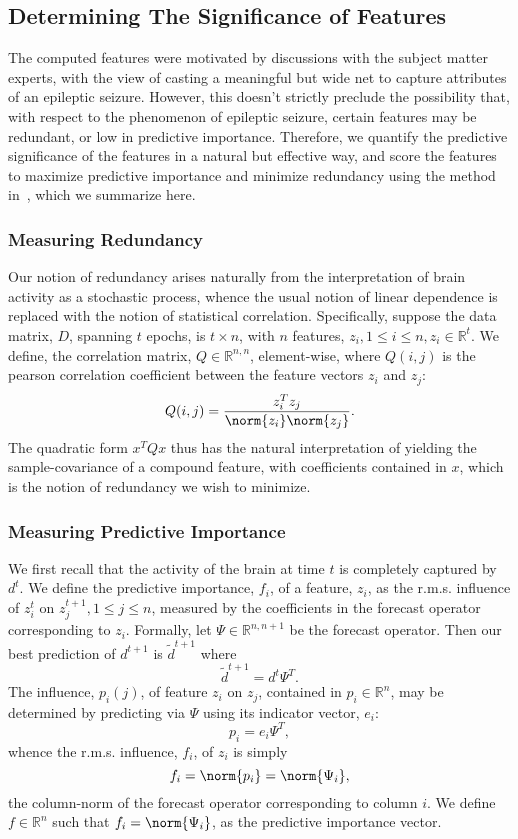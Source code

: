 \documentclass{article} %
\newcommand{\rl}{\mathbb{R}}
\newcommand{\rls}[1]{\mathbb{R}^{#1}}
\begin{document}
\subsection{Determining The Significance of Features}
The computed features were motivated by discussions with the subject matter experts, with the view of casting a meaningful but wide net to capture  attributes of an epileptic seizure. However, this doesn't strictly preclude the possibility that, with respect to the phenomenon of epileptic seizure, certain features may be redundant, or low in predictive importance. Therefore, we quantify the predictive significance of the features in a natural but effective way, and score the features to maximize predictive importance and minimize redundancy using the method in~\cite{quadprog_featsel}, which we summarize here.

\subsubsection{Measuring Redundancy}
Our notion of redundancy arises naturally from the interpretation of brain activity as a stochastic process, whence the usual notion of linear dependence is replaced with the notion of statistical correlation. Specifically, suppose the data matrix, $D$, spanning $t$ epochs, is $t \times n$, with $n$ features, $z_i, 1 \leq i \leq n, z_i \in \rl^t$. We define, the correlation matrix, $Q \in \rls{n, n}$, element-wise, where $Q(i, j)$ is the pearson correlation coefficient between the feature vectors $z_i$ and $z_j$:
\[ Q(i, j) = \frac{z_i ^T z_j}{\norm{z_i}\norm{z_j}}.  \]
The quadratic form $x^T Q x$ thus has the natural interpretation of yielding the sample-covariance of a compound feature, with coefficients contained in $x$, which is the notion of redundancy we wish to minimize.

\subsubsection{Measuring Predictive Importance}
We first recall that the activity of the brain at time $t$ is completely captured by $d^t$. We define the predictive importance, $f_i$, of a feature, $z_i$, as the r.m.s. influence of $z_i ^t$ on $z_j ^{t+1}, 1 \leq j \leq n$, measured by the coefficients in the forecast operator corresponding to $z_i$. Formally, let $\Psi \in \rls{n, n+1}$ be the forecast operator. Then our best prediction of $d^{t+1}$ is $\tilde{d}^{t+1}$ where
\[ \tilde d^{t+1} = d^t \Psi ^T. \]
The influence, $p_i (j)$, of feature $z_i$ on $z_j$, contained in $p_i \in \rl^n$, may be determined by predicting via $\Psi$ using its indicator vector, $e_i$:
\[ p_i = e_i \Psi^T,  \]
whence the r.m.s. influence, $f_i$, of $z_i$ is simply 
\[ f_i = \norm{p_i} = \norm{\Psi_i}, \]
the column-norm of the forecast operator corresponding to column $i$. We define $f \in \rl^n$ such that $f_i = \norm{\Psi_i}$, as the predictive importance vector. 
\end{document}

